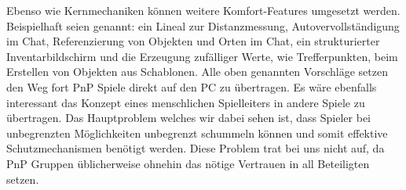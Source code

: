 Ebenso wie Kernmechaniken können weitere Komfort-Features umgesetzt werden. Beispielhaft seien genannt:
ein Lineal zur Distanzmessung,
Autovervollständigung im Chat,
Referenzierung von Objekten und Orten im Chat,
ein strukturierter Inventarbildschirm und
die Erzeugung zufälliger Werte, wie Trefferpunkten, beim Erstellen von Objekten aus Schablonen.\newline
Alle oben genannten Vorschläge setzen den Weg fort PnP Spiele direkt auf den PC zu übertragen. Es wäre ebenfalls interessant das Konzept eines menschlichen Spielleiters in andere Spiele zu übertragen. Das Hauptproblem welches wir dabei sehen ist, dass Spieler bei unbegrenzten Möglichkeiten unbegrenzt schummeln können und somit effektive Schutzmechanismen benötigt werden. Diese Problem trat bei uns nicht auf, da PnP Gruppen üblicherweise ohnehin das nötige Vertrauen in all Beteiligten setzen.